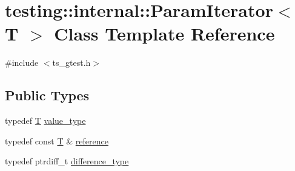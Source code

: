 \hypertarget{classtesting_1_1internal_1_1ParamIterator}{\section{testing\-:\-:internal\-:\-:Param\-Iterator$<$ T $>$ Class Template Reference}
\label{classtesting_1_1internal_1_1ParamIterator}
}


{\ttfamily \#include $<$ts\-\_\-gtest.\-h$>$}

\subsection*{Public Types}
\begin{DoxyCompactItemize}
\item 
typedef \hyperlink{calib3d_8hpp_a3efb9551a871ddd0463079a808916717}{T} \hyperlink{classtesting_1_1internal_1_1ParamIterator_a4afe3a68db0d0744753c8afe262e35df}{value\-\_\-type}
\item 
typedef const \hyperlink{calib3d_8hpp_a3efb9551a871ddd0463079a808916717}{T} \& \hyperlink{classtesting_1_1internal_1_1ParamIterator_ac96f133ffa06fc0f9faff5a1c7954382}{reference}
\item 
typedef ptrdiff\-\_\-t \hyperlink{classtesting_1_1internal_1_1ParamIterator_a6c37240a04ba3fc4c56f6c413cf4771d}{difference\-\_\-type}
\end{DoxyCompactItemize}
